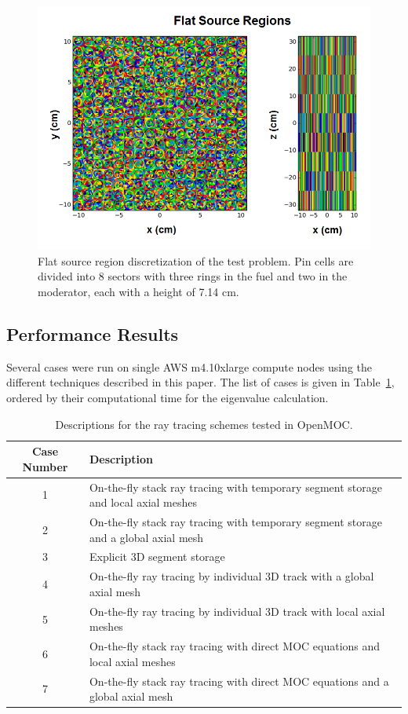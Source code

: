 \begin{figure}[ht!]
	\centering
	\includegraphics[width=0.75\linewidth]{figures/ph2016/fsrs.png}
	\caption{Flat source region discretization of the test problem. Pin cells are divided into 8 sectors with three rings in the fuel and two in the moderator, each with a height of 7.14 cm.}
	\label{fig::FSRs}
\end{figure}


\subsection{Performance Results}
Several cases were run on single AWS m4.10xlarge compute nodes using the different techniques described in this paper. The list of cases is given in Table~\ref{tab::cases}, ordered by their computational time for the eigenvalue calculation. 

\begin{table}[ht]
	\centering
	\caption{Descriptions for the ray tracing schemes tested in OpenMOC.}
	\begin{tabular}{c m{10cm}}
		\toprule
		\textbf{Case Number} & \textbf{Description} \\
		\midrule
		1 & On-the-fly stack ray tracing with temporary segment storage and local axial meshes \\
		2 & On-the-fly stack ray tracing with temporary segment storage and a global axial mesh \\
		3 & Explicit 3D segment storage \\
		4 & On-the-fly ray tracing by individual 3D track with a global axial mesh\\
		5 &On-the-fly ray tracing by individual 3D track with local axial meshes\\
		6 & On-the-fly stack ray tracing with direct MOC equations and local axial meshes \\
		7 & On-the-fly stack ray tracing with direct MOC equations and a global axial mesh \\
		\bottomrule
	\end{tabular}
	\label{tab::cases}
\end{table}


